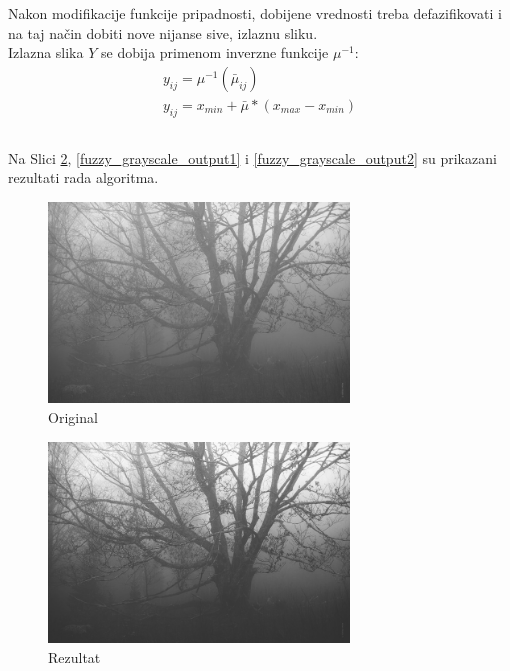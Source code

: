 \documentclass[12pt,a4paper]{article}
\theoremstyle{definition}
\theoremstyle{remark}
\theoremstyle{plain}
\begin{document}
Nakon modifikacije funkcije pripadnosti, dobijene vrednosti treba defazifikovati i na taj na\v cin dobiti nove nijanse sive, izlaznu sliku.\\
Izlazna slika $Y$ se dobija primenom inverzne funkcije $\mu^{-1}$:\\
\begin{align*}
  y_{ij} = \mu^{-1}(\bar\mu_{ij})\\
  y_{ij} = x_{min} + \bar\mu * (x_{max} - x_{min})
\end{align*}

\inputminted[tabsize=2,breaklines]{cpp}{codes/latex/fuzzy_grayscale.cpp}

Na Slici \ref{tree_fuzzy_grayscale_output}, \ref{fuzzy_grayscale_output1} i \ref{fuzzy_grayscale_output2} su prikazani rezultati rada algoritma.

\begin{multicols}{2}
\begin{figure}[H]
\centering
\includegraphics[width=8cm]{images/tree.jpg}
  \caption{Original}\label{tree_fuzzy_grayscale_input}
\end{figure}
\columnbreak
\begin{figure}[H]
\centering
\includegraphics[width=8cm]{images/fuzzy_grayscale_0.jpg}
  \caption{Rezultat}\label{tree_fuzzy_grayscale_output}
\end{figure}
\end{multicols}
\end{document}
